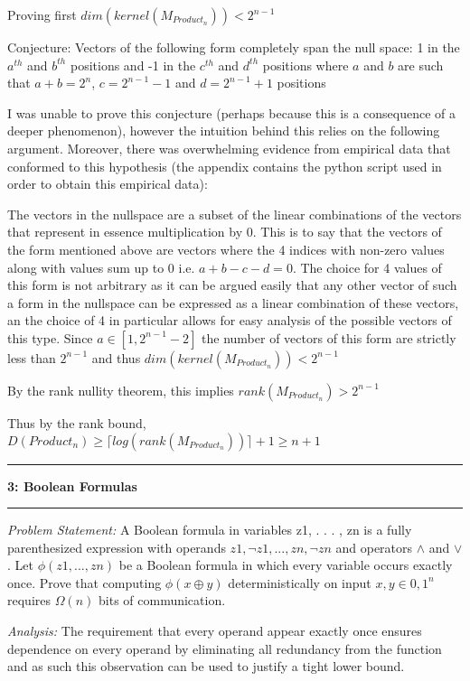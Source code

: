 \documentclass[11pt]{article}
\newcommand\question[2]{\vspace{.25in}\hrule\textbf{#1: #2}\vspace{.5em}\hrule\vspace{.10in}}
\newcommand\analysis{\vspace{.10in}\emph{Analysis: }\newline}
\newcommand\problem{\emph{Problem Statement:}\newline}
\begin{document}
\proof
Proving first $dim(kernel(M_{Product_n})) < 2^{n - 1}$

Conjecture: Vectors of the following form completely span the null space:
1 in the $a^{th}$ and $b^{th}$  positions and -1 in the $c^{th}$ and $d^{th}$ positions where $a$ and $b$ are such that $a + b = 2^n$, $c = 2^{n-1} - 1$ and $d = 2^{n-1} + 1$ positions 

I was unable to prove this conjecture (perhaps because this is a consequence of a deeper phenomenon), however the intuition behind this relies on the following argument. Moreover, there was overwhelming evidence from empirical data that conformed to this hypothesis (the appendix contains the python script used in order to obtain this empirical data):

The vectors in the nullspace are a subset of the linear combinations of the vectors that represent in essence multiplication by 0. This is to say that the vectors of the form mentioned above are vectors where the 4 indices with non-zero values along with values sum up to 0 i.e. $a + b - c - d = 0$. The choice for 4 values of this form is not arbitrary as it can be argued easily that any other vector of such a form in the nullspace can be expressed as a linear combination of these vectors, an the choice of 4 in particular allows for easy analysis of the possible vectors of this type. Since $a \in [1, 2^{n - 1} - 2]$ the number of vectors of this form are strictly less than $2^{n - 1}$ and thus $dim(kernel(M_{Product_n})) < 2^{n - 1}$

By the rank nullity theorem, this implies $rank(M_{Product_n}) > 2 ^ {n - 1}$

Thus by the rank bound, $D(Product_n) \geq \lceil log(rank(M_{Product_n})) \rceil + 1 \geq n + 1$

\newpage

\question{3}{Boolean Formulas} 

\problem
A Boolean formula in variables z1, . . . , zn is a fully
parenthesized expression with operands $z1, \lnot z1, . . . , zn, \lnot zn$ and operators $\land$ and $\lor$. Let $\phi (z1, . . . , zn)$ be a Boolean formula in which every variable occurs exactly once. Prove that computing $\phi (x \oplus y)$ deterministically on input $x, y \in {0, 1}^n$
requires
$\Omega(n)$ bits of communication.

\analysis
The requirement that every operand appear exactly once ensures dependence on every operand by eliminating all redundancy from the function and as such this observation can be used to justify a tight lower bound. 
\end{document}
